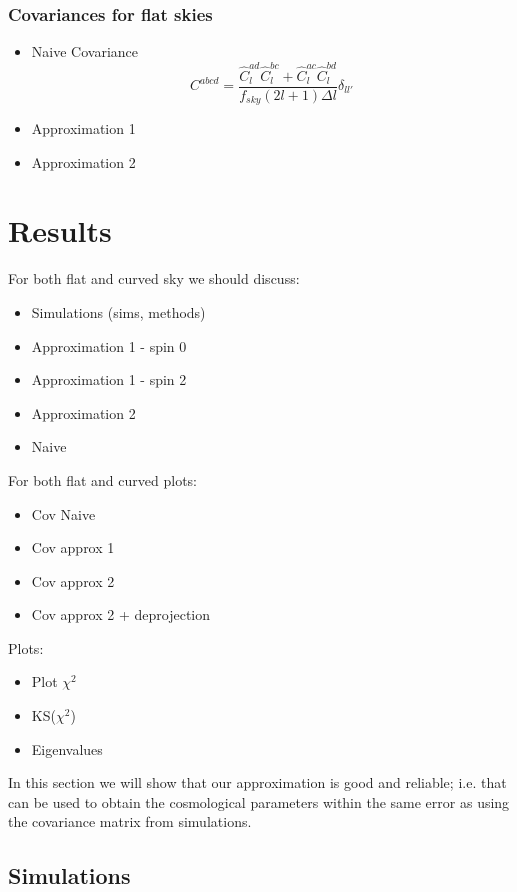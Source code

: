 \documentclass[a4paper,11pt]{article}
\newcommand{\pcl}[3]{\hat C_{#1}^{#2 #3}}
\begin{document}
    \subsubsection{Covariances for flat skies}


\begin{itemize}
\item Naive Covariance
  \begin{equation}
    C^{abcd} = \frac{\pcl{l}ad \pcl{l}bc + \pcl{l}ac \pcl{l}bd}{f_{sky} (2l +
      1) \Delta l} \delta_{ll'}
    \label{eq:naive}
  \end{equation}
\item Approximation 1
\item Approximation 2
\end{itemize}




\section{Results}
For both flat and curved sky we should discuss:
\begin{itemize}
\item Simulations (sims, methods)
\item Approximation 1 - spin 0
\item Approximation 1 - spin 2
\item Approximation 2
\item Naive
\end{itemize}

For both flat and curved plots:
\begin{itemize}
\item Cov Naive
\item Cov approx 1
\item Cov approx 2
\item Cov approx 2 + deprojection
\end{itemize}

Plots:
\begin{itemize}
\item Plot $\chi^2$
\item KS($\chi^2$)
\item Eigenvalues
\end{itemize}

In this section we will show that our approximation is good and reliable; i.e.
that can be used to obtain the cosmological parameters within the same error
as using the covariance matrix from simulations. 

\subsection{Simulations}
\end{document}
